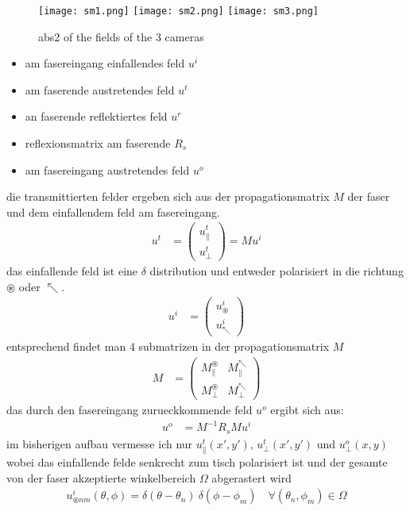 \documentclass{article}
\begin{document}
\begin{figure}[htbp]
  \centering
  \texttt{[image: sm1.png]}
  \texttt{[image: sm2.png]}
  \texttt{[image: sm3.png]}
  \caption{abs2 of the fields of the 3 cameras}
  \label{fig:mosaic}
\end{figure}


\begin{itemize}
\item am fasereingang einfallendes feld $u^i$
\item am faserende austretendes feld $u^t$
\item an faserende reflektiertes feld $u^r$
\item reflexionsmatrix am faserende $R_s$
\item am fasereingang austretendes feld $u^o$
\end{itemize}

die transmittierten felder ergeben sich aus der propagationsmatrix $M$
der faser und dem einfallendem feld am fasereingang.
\begin{align}
  u^t &= \begin{pmatrix}u^t_\parallel \\ u^t_\perp\end{pmatrix} = M u^i
\end{align}
das einfallende feld ist eine $\delta$ distribution und entweder
polarisiert in die richtung $\circledast$ oder $\nwarrow$.
\begin{align}
  u^i &= \begin{pmatrix}u^i_\circledast \\ u^i_\nwarrow\end{pmatrix}
\end{align}
entsprechend findet man 4 submatrizen in der propagationsmatrix $M$
\begin{align}
  M &= \begin{pmatrix}
    M^\circledast_\parallel & M^\nwarrow_\parallel \\
    M^\circledast_\perp & M^\nwarrow_\perp 
  \end{pmatrix}
\end{align}
das durch den fasereingang zurueckkommende feld $u^o$ ergibt sich aus:
\begin{align}
  \label{eq:ruecktrafo}
  u^o &= M^{-1} R_s M u^i
\end{align}
im bisherigen aufbau vermesse ich nur $u^t_\parallel(x',y')$,
$u^t_\perp(x',y')$ und $u^o_\perp(x,y)$ wobei das einfallende felde
senkrecht zum tisch polarisiert ist und der gesamte von der faser
akzeptierte winkelbereich $\Omega$ abgerastert wird
\begin{align}
  u^i_{\circledast nm}(\theta,\phi) = \delta(\theta-\theta_n)\ \delta(\phi-\phi_m) \quad \forall (\theta_n,\phi_m)\in\Omega
\end{align}
 
\end{document}
